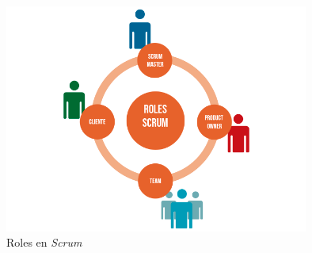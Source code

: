 \begin{figure}[H]
    \centering
    \includegraphics[width=10cm]{Images/roles.png}
    \caption{Roles en \textit{Scrum}}
\end{figure}